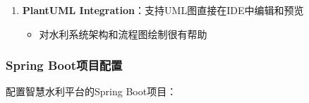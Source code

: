 \begin{enumerate}
  \begin{itemize}
  \tightlist
  \item
    提示可用的快捷键，帮助养成使用快捷键的习惯
  \end{itemize}
\item
  \textbf{PlantUML Integration}：支持UML图直接在IDE中编辑和预览

  \begin{itemize}
  \tightlist
  \item
    对水利系统架构和流程图绘制很有帮助
  \end{itemize}
\end{enumerate}

\subsubsection{Spring
Boot项目配置}\label{spring-bootux9879ux76eeux914dux7f6e}

配置智慧水利平台的Spring Boot项目：

